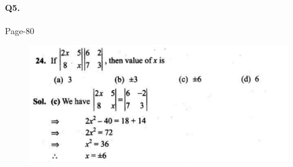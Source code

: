\documentclass{article}
\begin{document}
\paragraph{Q5.}
\begin{flushright}
Page-80
\end{flushright}
\begin{figure}[H]
    \includegraphics[scale=0.5]{determinants_l1_ps_5.png}
\end{figure}
\clearpage


\end{document}
